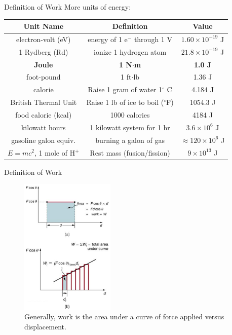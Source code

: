 \documentclass{beamer}
\begin{document}
\begin{frame}{Definition of Work}
\small
More units of energy:
\begin{table}
\centering
\begin{tabular}{c | c | c}
\alert{Unit Name} & \alert{Definition} & \alert{Value} \\ \hline
electron-volt (eV) & energy of 1 e$^{-}$ through 1 V & $1.60\times 10^{-19}$ J \\ \hline
1 Rydberg (Rd) & ionize 1 hydrogen atom & $21.8\times 10^{-19}$ J \\ \hline
\textbf{Joule} & \textbf{1 N$\cdot$m} & \textbf{1.0 J} \\ \hline
foot-pound & 1 ft$\cdot$lb & 1.36 J \\ \hline
calorie & Raise 1 gram of water 1$^{\circ}$ C & 4.184 J \\ \hline
British Thermal Unit & Raise 1 lb of ice to boil ($^{\circ}$F) & 1054.3 J \\ \hline
food calorie (kcal) & 1000 calories & 4184 J \\ \hline
kilowatt hours & 1 kilowatt system for 1 hr & $3.6\times 10^6$ J \\ \hline
gasoline galon equiv. & burning a galon of gas & $\approx 120 \times 10^6$ J \\ \hline
$E = mc^2$, 1 mole of H$^{+}$ & Rest mass (fusion/fission) & $9 \times 10^{13}$ J \\ \hline
\end{tabular}
\end{table}
\end{frame}

\begin{frame}{Definition of Work}
\begin{figure}
\centering
\includegraphics[width=0.4\textwidth]{figures/area.png}
\caption{\label{fig:area} Generally, work is the area under a curve of force applied versus displacement.}
\end{figure}
\end{frame}
\end{document}
